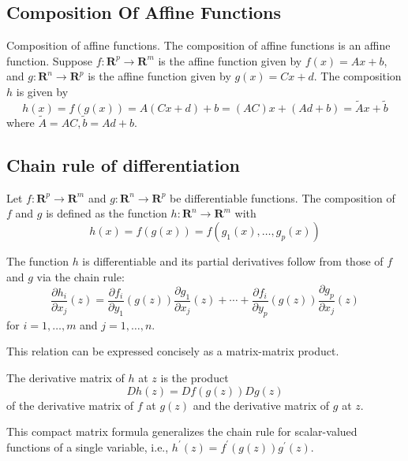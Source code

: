 \subsection{Composition Of Affine Functions}

Composition of affine functions. The composition of affine functions is an affine function. Suppose $ f: \mathbf{R}^{p} \rightarrow \mathbf{R}^{m} $ is the affine function given by $ f(x)=A x+b $, and $ g: \mathbf{R}^{n} \rightarrow \mathbf{R}^{p} $ is the affine function given by $ g(x)=C x+d $. The composition $ h $ is given by
$$
h(x)=f(g(x))=A(C x+d)+b=(A C) x+(A d+b)=\tilde{A} x+\tilde{b}
$$
where $ \tilde{A}=A C, \tilde{b}=A d+b $.

\subsection{Chain rule of differentiation}

\begin{definition}
    Let $ f: \mathbf{R}^{p} \rightarrow \mathbf{R}^{m} $ and $ g: \mathbf{R}^{n} \rightarrow \mathbf{R}^{p} $ be differentiable functions. The composition of $ f $ and $ g $ is defined as the function $ h: \mathbf{R}^{n} \rightarrow \mathbf{R}^{m} $ with
$$
h(x)=f(g(x))=f\left(g_{1}(x), \ldots, g_{p}(x)\right)
$$
\end{definition}

\begin{theorem}
    The function $ h $ is differentiable and its partial derivatives follow from those of $ f $ and $ g $ via the chain rule:
$$
\frac{\partial h_{i}}{\partial x_{j}}(z)=\frac{\partial f_{i}}{\partial y_{1}}(g(z)) \frac{\partial g_{1}}{\partial x_{j}}(z)+\cdots+\frac{\partial f_{i}}{\partial y_{p}}(g(z)) \frac{\partial g_{p}}{\partial x_{j}}(z)
$$
for $ i=1, \ldots, m $ and $ j=1, \ldots, n $.
\end{theorem}

This relation can be expressed concisely as a matrix-matrix product.

\begin{corollary}
    The derivative matrix of $ h $ at $ z $ is the product
$$
D h(z)=D f(g(z)) D g(z)
$$
of the derivative matrix of $ f $ at $ g(z) $ and the derivative matrix of $ g $ at $ z $.
\end{corollary}

This compact matrix formula generalizes the chain rule for scalar-valued functions of a single variable, i.e., $ h^{\prime}(z)=f^{\prime}(g(z)) g^{\prime}(z) $.

